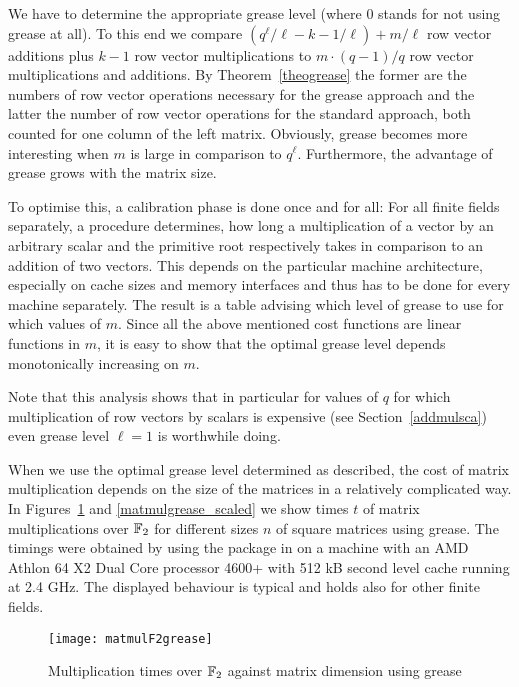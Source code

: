 We have to determine the appropriate grease level (where $0$ stands for not
using grease at all). To this end we 
compare $(q^\ell/\ell - k - 1/\ell) + m/\ell$ 
row vector additions plus $k-1$ row vector multiplications to
$m \cdot (q-1)/q$ row vector multiplications and additions.
By Theorem~\ref{theogrease} the former are the numbers of row vector
operations necessary for the grease approach and the latter the number
of row vector operations for the standard approach, both counted for
one column of the left matrix. Obviously, grease becomes more interesting 
when $m$ is large in comparison to $q^\ell$. 
Furthermore, the advantage of grease
grows with the matrix size.

To optimise this, a calibration phase is done once and for all: For all finite
%
fields separately, a procedure determines, how long a multiplication
of a vector by an arbitrary scalar and the primitive root respectively
takes in comparison to an addition of two vectors.
This depends on the particular machine architecture, especially on 
cache sizes and memory interfaces and thus has to be done for every
machine separately. The result is a table advising which level of grease
to use for which values of $m$. Since all the above mentioned cost
functions are linear functions in $m$, it is easy to show that the
optimal grease level depends monotonically increasing on $m$.

Note that this analysis shows that in particular for values of $q$
for which multiplication of row vectors by scalars is expensive (see
Section~\ref{addmulsca}) even grease level $\ell = 1$ is worthwhile
doing.

When we use the optimal grease level determined as described, the
cost of matrix multiplication depends on the size of the matrices
in a relatively complicated way. In Figures~\ref{matmulgrease} and
\ref{matmulgrease_scaled} we show times $t$ of matrix multiplications
over $\mathbb{F}_2$ for different sizes $n$ of square matrices using grease.
The timings were obtained by using the {\cvec} package in {\GAP} on a
machine with an AMD Athlon 64 X2 Dual Core processor 4600+ with 512
kB second level cache running at 2.4 GHz. The displayed behaviour is
typical and holds also for other finite fields.

\begin{figure}[ht]
\begin{center}
\texttt{[image: matmulF2grease]}
\end{center}
\caption{Multiplication times over $\mathbb{F}_2$ against matrix dimension
using grease}
%
\label{matmulgrease}
\end{figure}

